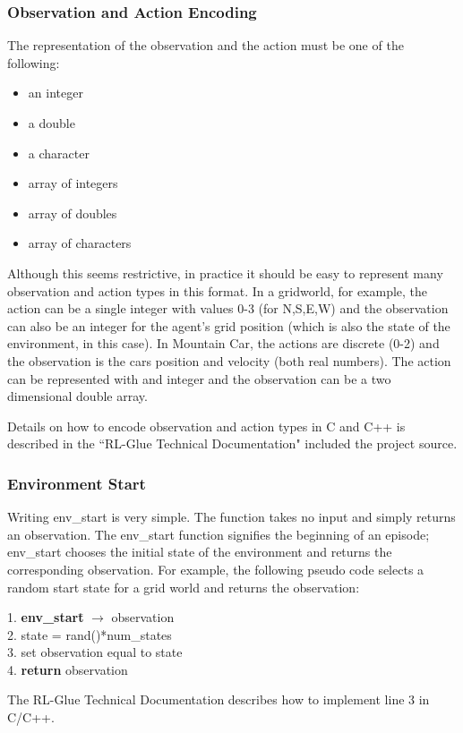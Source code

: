 \documentclass[11pt]{article}
\begin{document}
\subsubsection{Observation and Action Encoding}
The representation of the observation and the action must be one of the following: 
\begin{itemize}
\item an integer
\item a double
\item a character
\item array of integers
\item array of doubles
\item array of characters
\end{itemize}
Although this seems restrictive, in practice it should be easy to represent many observation and action types in this format. In a gridworld, for example, the action can be a single integer with values 0-3 (for N,S,E,W) and the observation can also be an integer for the agent's grid position (which is also the state of the environment, in this case). In Mountain Car, the actions are discrete (0-2) and the observation is the cars position and velocity (both real numbers). The action can be represented with and integer and the observation can be a two dimensional double array. 


Details on how to encode observation and action types in C and C++ is described in the ``RL-Glue Technical Documentation" included the project source.

\subsubsection{Environment Start}
Writing env\_start is very simple. The function takes no input and simply returns an observation. The env\_start function signifies the beginning of an episode; env\_start chooses the initial state of the environment and returns the corresponding observation. For example, the following pseudo code selects a random start state for a grid world and returns the observation:
\begin{tabbing}
1. {\bf env\_start}\= $\rightarrow$ observation\\
2. \>state = rand()*num\_states\\
3. \>set observation equal to state\\
4. {\bf return} observation
\end{tabbing}
The RL-Glue Technical Documentation describes how to implement line 3 in C/C++.
\end{document}
